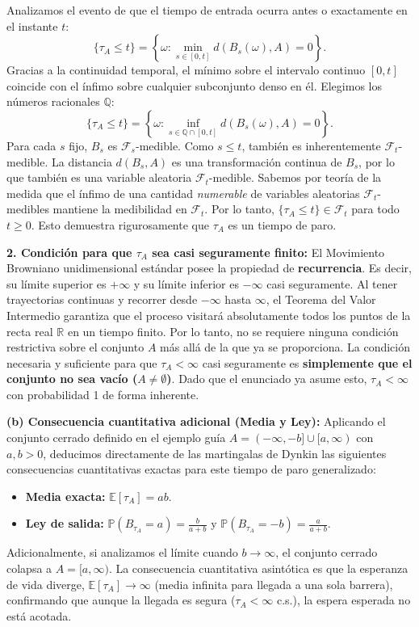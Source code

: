 \documentclass[11pt, letterpaper]{article}
\begin{document}
\begin{solucion}
    Analizamos el evento de que el tiempo de entrada ocurra antes o exactamente en el instante $t$:
    \[ \{\tau_A \le t\} = \left\{ \omega : \min_{s \in [0, t]} d(B_s(\omega), A) = 0 \right\}. \]
    Gracias a la continuidad temporal, el mínimo sobre el intervalo continuo $[0,t]$ coincide con el ínfimo sobre cualquier subconjunto denso en él. Elegimos los números racionales $\mathbb{Q}$:
    \[ \{\tau_A \le t\} = \left\{ \omega : \inf_{s \in \mathbb{Q} \cap [0, t]} d(B_s(\omega), A) = 0 \right\}. \]
    Para cada $s$ fijo, $B_s$ es $\mathcal{F}_s$-medible. Como $s \le t$, también es inherentemente $\mathcal{F}_t$-medible. La distancia $d(B_s, A)$ es una transformación continua de $B_s$, por lo que también es una variable aleatoria $\mathcal{F}_t$-medible.
    Sabemos por teoría de la medida que el ínfimo de una cantidad \textit{numerable} de variables aleatorias $\mathcal{F}_t$-medibles mantiene la medibilidad en $\mathcal{F}_t$.
    Por lo tanto, $\{\tau_A \le t\} \in \mathcal{F}_t$ para todo $t \ge 0$. Esto demuestra rigurosamente que $\tau_A$ es un tiempo de paro.

    \textbf{2. Condición para que $\tau_A$ sea casi seguramente finito:}
    El Movimiento Browniano unidimensional estándar posee la propiedad de \textbf{recurrencia}. Es decir, su límite superior es $+\infty$ y su límite inferior es $-\infty$ casi seguramente. 
    Al tener trayectorias continuas y recorrer desde $-\infty$ hasta $\infty$, el Teorema del Valor Intermedio garantiza que el proceso visitará absolutamente todos los puntos de la recta real $\mathbb{R}$ en un tiempo finito.
    Por lo tanto, no se requiere ninguna condición restrictiva sobre el conjunto $A$ más allá de la que ya se proporciona. La condición necesaria y suficiente para que $\tau_A < \infty$ casi seguramente es \textbf{simplemente que el conjunto no sea vacío ($A \neq \emptyset$)}. Dado que el enunciado ya asume esto, $\tau_A < \infty$ con probabilidad 1 de forma inherente.

    \vspace{3mm}
    \textbf{(b) Consecuencia cuantitativa adicional (Media y Ley):}
    Aplicando el conjunto cerrado definido en el ejemplo guía $A = (-\infty, -b] \cup [a, \infty)$ con $a,b > 0$, deducimos directamente de las martingalas de Dynkin las siguientes consecuencias cuantitativas exactas para este tiempo de paro generalizado:
    \begin{itemize}
        \item \textbf{Media exacta:} $\mathbb{E}[\tau_A] = ab$.
        \item \textbf{Ley de salida:} $\mathbb{P}(B_{\tau_A} = a) = \frac{b}{a+b}$ \quad y \quad $\mathbb{P}(B_{\tau_A} = -b) = \frac{a}{a+b}$.
    \end{itemize}
    Adicionalmente, si analizamos el límite cuando $b \to \infty$, el conjunto cerrado colapsa a $A = [a, \infty)$. La consecuencia cuantitativa asintótica es que la esperanza de vida diverge, $\mathbb{E}[\tau_A] \to \infty$ (media infinita para llegada a una sola barrera), confirmando que aunque la llegada es segura ($\tau_A < \infty$ c.s.), la espera esperada no está acotada.
\end{solucion}
\end{document}
